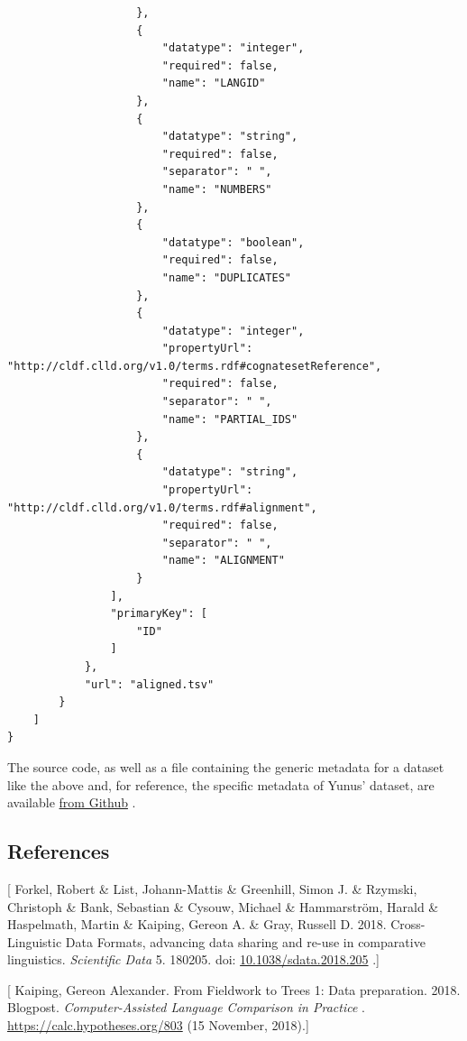 \documentclass[
  english,
  a4paper,
  oneside,tablecaptionabove
]{scrbook}
\begin{document}
\begin{lstlisting}
                    },
                    {
                        "datatype": "integer",
                        "required": false,
                        "name": "LANGID"
                    },
                    {
                        "datatype": "string",
                        "required": false,
                        "separator": " ",
                        "name": "NUMBERS"
                    },
                    {
                        "datatype": "boolean",
                        "required": false,
                        "name": "DUPLICATES"
                    },
                    {
                        "datatype": "integer",
                        "propertyUrl": "http://cldf.clld.org/v1.0/terms.rdf#cognatesetReference",
                        "required": false,
                        "separator": " ",
                        "name": "PARTIAL_IDS"
                    },
                    {
                        "datatype": "string",
                        "propertyUrl": "http://cldf.clld.org/v1.0/terms.rdf#alignment",
                        "required": false,
                        "separator": " ",
                        "name": "ALIGNMENT"
                    }
                ],
                "primaryKey": [
                    "ID"
                ]
            },
            "url": "aligned.tsv"
        }
    ]
}
\end{lstlisting}

The source code, as well as a file containing the generic metadata for a
dataset like the above and, for reference, the specific metadata of
Yunus' dataset, are available
\href{https://github.com/Anaphory/matrix_to_beastling}{from Github} .

\hypertarget{references-6}{%
\subsection*{References}\label{references-6}}

{[} Forkel, Robert \& List, Johann-Mattis \& Greenhill, Simon J. \&
Rzymski, Christoph \& Bank, Sebastian \& Cysouw, Michael \& Hammarström,
Harald \& Haspelmath, Martin \& Kaiping, Gereon A. \& Gray, Russell D.
2018. Cross-Linguistic Data Formats, advancing data sharing and re-use
in comparative linguistics. \emph{Scientific Data} 5. 180205. doi:
\href{https://doi.org/10.1038/sdata.2018.205}{10.1038/sdata.2018.205}
.{]}

{[} Kaiping, Gereon Alexander. From Fieldwork to Trees 1: Data
preparation. 2018. Blogpost. \emph{Computer-Assisted Language Comparison
in Practice} . \url{https://calc.hypotheses.org/803} (15 November,
2018).{]}
\end{document}
